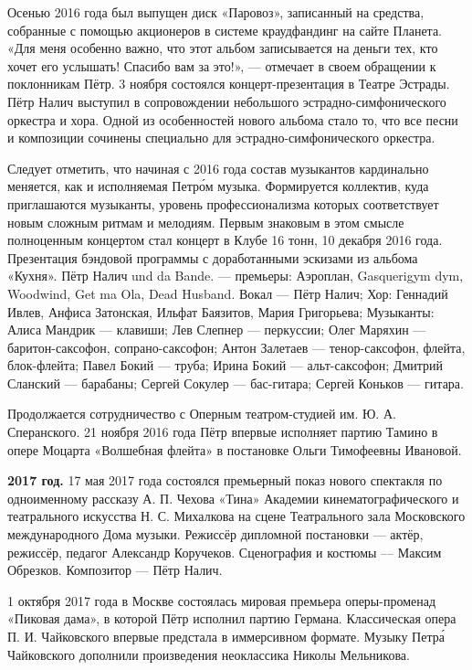 Осенью 2016 года был выпущен диск «Паровоз», записанный на средства, собранные с помощью акционеров в системе краудфандинг на сайте Планета. «Для меня особенно важно, что этот альбом записывается на деньги тех, кто хочет его услышать! Спасибо вам за это!», --- отмечает в своем обращении к поклонникам Пётр. 3 ноября состоялся концерт-презентация в Театре Эстрады. Пётр Налич выступил в сопровождении небольшого эстрадно-симфонического оркестра и хора. Одной из особенностей нового альбома стало то, что все песни и композиции сочинены специально для эстрадно-симфонического оркестра.

Следует отметить, что начиная с 2016 года состав музыкантов кардинально меняется, как и исполняемая Петр\'{о}м музыка. Формируется коллектив, куда приглашаются музыканты, уровень профессионализма которых соответствует новым сложным ритмам и мелодиям. Первым знаковым в этом смысле полноценным концертом стал концерт в Клубе 16 тонн, 10 декабря 2016 года. Презентация бэндовой программы с доработанными эскизами из альбома «Кухня». Пётр Налич und da Bande. --- премьеры: Аэроплан, Gasquerigym dym, Woodwind, Get ma Ola, Dead Husband. Вокал --- Пётр Налич; Хор: Геннадий Ивлев, Анфиса Затонская, Ильфат Баязитов, Мария Григорьева; Музыканты: Алиса Мандрик --- клавиши; Лев Слепнер --- перкуссии; Олег Маряхин --- баритон-саксофон, сопрано-саксофон; Антон Залетаев --- тенор-саксофон, флейта, блок-флейта; Павел Бокий --- труба; Ирина Бокий --- альт-саксофон; Дмитрий Сланский --- барабаны; Сергей Сокулер --- бас-гитара; Сергей Коньков --- гитара.

Продолжается сотрудничество с Оперным театром-студией им. Ю. А. Сперанского. 21 ноября 2016 года Пётр впервые исполняет партию Тамино в опере Моцарта «Волшебная флейта» в постановке Ольги Тимофеевны Ивановой.



\textbf{2017 год.}
17 мая 2017 года состоялся премьерный показ нового спектакля по одноименному рассказу А. П. Чехова «Тина» Академии кинематографического и театрального искусства Н. С. Михалкова на сцене Театрального зала Московского международного Дома музыки. Режиссёр дипломной постановки --- актёр, режиссёр, педагог Александр Коручеков. Сценография и костюмы --- Максим Обрезков. Композитор --- Пётр Налич.

1 октября 2017 года в Москве состоялась мировая премьера оперы-променад «Пиковая дама», в которой Пётр исполнил партию Германа. Классическая опера П. И. Чайковского впервые предстала в иммерсивном формате. Музыку Петр\'{а} Чайковского дополнили произведения неоклассика Николы Мельникова.

